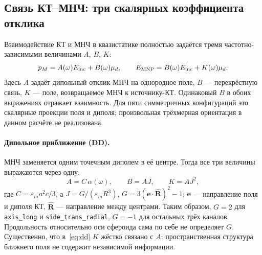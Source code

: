 \subsection{Связь КТ--МНЧ: три скалярных коэффициента отклика}
\label{sec:coupling}

Взаимодействие КТ и МНЧ в квазистатике полностью задаётся тремя
частотно-зависимыми величинами $A$, $B$, $K$:
\begin{equation}
  p_M=A(\omega)E_{\rm inc}+B(\omega)\mu_d,\qquad
  E_{\rm MNP}=B(\omega)E_{\rm inc}+K(\omega)\mu_d.
  \label{eq:ports}
\end{equation}
Здесь $A$ задаёт дипольный отклик МНЧ на однородное поле, $B$ ---
перекрёстную связь, $K$ --- поле, возвращаемое МНЧ к источнику-КТ.
Одинаковый $B$ в обоих выражениях отражает взаимность. Для пяти
симметричных конфигураций это скалярные проекции поля и диполя;
произвольная трёхмерная ориентация в данном расчёте не реализована.

\paragraph{Дипольное приближение (DD).} МНЧ заменяется одним точечным диполем
в её центре. Тогда все три величины выражаются через одну:
\begin{equation}
  A = C\,\alpha(\omega), \qquad B = A J, \qquad K = A J^2,
  \label{eq:dd}
\end{equation}
где $C=\varepsilon_m a^2 c/3$, а $J=G/(\varepsilon_m R^3)$,
$G=3(\mathbf e\cdot\widehat{\mathbf R})^2-1$; $\mathbf e$ --- направление
поля и диполя КТ, $\widehat{\mathbf R}$ --- направление между центрами.
Таким образом, $G=2$ для \texttt{axis\_long} и
\texttt{side\_trans\_radial}, $G=-1$ для остальных трёх каналов.
Продольность относительно оси сфероида сама по себе не определяет $G$.
Существенно, что в~\eqref{eq:dd} $K$ жёстко связано с
$A$: пространственная структура ближнего поля не содержит независимой
информации.


